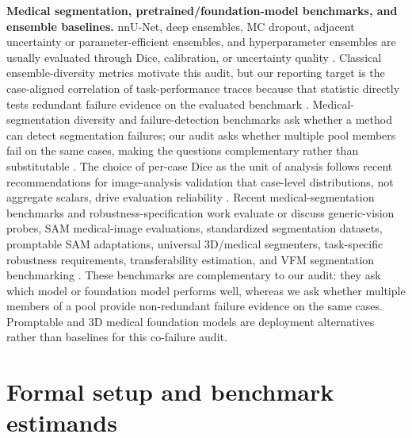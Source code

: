 \documentclass{article}
\begin{document}
\textbf{Medical segmentation, pretrained/foundation-model benchmarks, and ensemble baselines.} nnU-Net, deep ensembles, MC dropout, adjacent uncertainty or parameter-efficient ensembles, and hyperparameter ensembles are usually evaluated through Dice, calibration, or uncertainty quality \citep{isensee2021nnunet,isensee2024revisit,lakshminarayanan2017deepens,gal2016mcdropout,mehrtash2020calibration,jungo2019reliability,loraensemble2024,d2ue2024}. Classical ensemble-diversity metrics motivate this audit, but our reporting target is the case-aligned correlation of task-performance traces because that statistic directly tests redundant failure evidence on the evaluated benchmark \citep{kuncheva2003diversity,ganaie2022ensemble,wood2024diversity}. Medical-segmentation diversity and failure-detection benchmarks ask whether a method can detect segmentation failures; our audit asks whether multiple pool members fail on the same cases, making the questions complementary rather than substitutable \citep{georgescu2022dipe,zenk2024medseg}. The choice of per-case Dice as the unit of analysis follows recent recommendations for image-analysis validation that case-level distributions, not aggregate scalars, drive evaluation reliability \citep{maierhein2024metrics}. Recent medical-segmentation benchmarks and robustness-specification work evaluate or discuss generic-vision probes, SAM medical-image evaluations, standardized segmentation datasets, promptable SAM adaptations, universal 3D/medical segmenters, task-specific robustness requirements, transferability estimation, and VFM segmentation benchmarking \citep{baharoon2024dinov2radiology,huang2024sammedical,medsegbench2024,sam,medsam2024,sammed2d2023,medicosam2025,zhu2024medsam2,ma2025medsam2,gu2025melba,he2025vista3d,kim2025showandsegment,xian2025robustness,yang2023ccfv,kerssies2024benchmark}. These benchmarks are complementary to our audit: they ask which model or foundation model performs well, whereas we ask whether multiple members of a pool provide non-redundant failure evidence on the same cases. Promptable and 3D medical foundation models are deployment alternatives rather than baselines for this co-failure audit.

\section{Formal setup and benchmark estimands}
\label{sec:formal}
\end{document}
